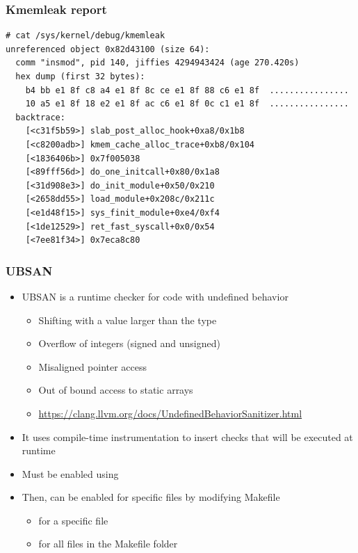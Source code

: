 \begin{frame}[fragile]
  \frametitle{Kmemleak report}
  \begin{block}{}
    \begin{verbatim}
# cat /sys/kernel/debug/kmemleak
unreferenced object 0x82d43100 (size 64):
  comm "insmod", pid 140, jiffies 4294943424 (age 270.420s)
  hex dump (first 32 bytes):
    b4 bb e1 8f c8 a4 e1 8f 8c ce e1 8f 88 c6 e1 8f  ................
    10 a5 e1 8f 18 e2 e1 8f ac c6 e1 8f 0c c1 e1 8f  ................
  backtrace:
    [<c31f5b59>] slab_post_alloc_hook+0xa8/0x1b8
    [<c8200adb>] kmem_cache_alloc_trace+0xb8/0x104
    [<1836406b>] 0x7f005038
    [<89fff56d>] do_one_initcall+0x80/0x1a8
    [<31d908e3>] do_init_module+0x50/0x210
    [<2658dd55>] load_module+0x208c/0x211c
    [<e1d48f15>] sys_finit_module+0xe4/0xf4
    [<1de12529>] ret_fast_syscall+0x0/0x54
    [<7ee81f34>] 0x7eca8c80
    \end{verbatim}
  \end{block}
\end{frame}

\begin{frame}
  \frametitle{UBSAN}
  \begin{itemize}
    \item UBSAN is a runtime checker for code with undefined behavior
    \begin{itemize}
      \item Shifting with a value larger than the type
      \item Overflow of integers (signed and unsigned)
      \item Misaligned pointer access
      \item Out of bound access to static arrays
      \item \url{https://clang.llvm.org/docs/UndefinedBehaviorSanitizer.html}
    \end{itemize}
    \item It uses compile-time instrumentation to insert checks that will be
          executed at runtime
    \item Must be enabled using 
    \item Then, can be enabled for specific files by modifying Makefile
    \begin{itemize}
      \item {} for a specific file
      \item {} for all files in the Makefile folder
    \end{itemize}
  \end{itemize}
\end{frame}


